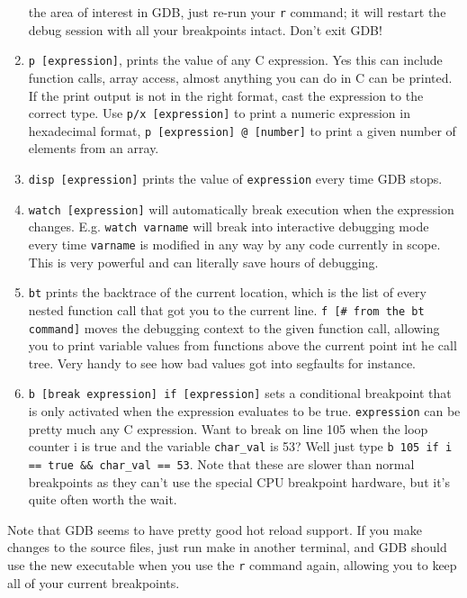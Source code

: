 \documentclass[11pt]{article}
\begin{document}
\begin{enumerate}
        the area of interest in GDB, just re-run your \texttt{r} command; it will restart
        the debug session with all your breakpoints intact. Don't exit GDB!
    \item \texttt{p [expression]}, prints the value of any C expression. Yes this can
        include function calls, array access, almost anything you can do in C can be
        printed. If the print output is not in the right format, cast the expression to
        the correct type. Use \texttt{p/x [expression]} to print a numeric expression in
        hexadecimal format, \texttt{p [expression] @ [number]} to print a given number of
        elements from an array.
    \item \texttt{disp [expression]} prints the value of \texttt{expression} every time
        GDB stops.
    \item \texttt{watch [expression]} will automatically break execution when the
        expression changes. E.g. \texttt{watch varname} will break into interactive
        debugging mode every time \texttt{varname} is modified in any way by any code
        currently in scope. This is very powerful and can literally save hours of
        debugging.
    \item \texttt{bt} prints the backtrace of the current location, which is the list of
        every nested function call that got you to the current line. \texttt{f [\# from the
        bt command]} moves the debugging context to the given function call, allowing you
        to print variable values from functions above the current point int he call tree.
        Very handy to see how bad values got into segfaults for instance.
    \item \texttt{b [break expression] if [expression]} sets a conditional breakpoint that
        is only activated when the expression evaluates to be true. \texttt{expression}
        can be pretty much any C expression. Want to break on line 105 when the loop
        counter i is true and the variable \texttt{char\_val} is 53? Well just type
        \texttt{b 105 if i == true \&\& char\_val == 53}. Note that these are slower than
        normal breakpoints as they can't use the special CPU breakpoint hardware, but it's
        quite often worth the wait.
\end{enumerate}

Note that GDB seems to have pretty good hot reload support. If you make changes to the
source files, just run make in another terminal, and GDB should use the new executable
when you use the \texttt{r} command again, allowing you to keep all of your current
breakpoints.
\end{document}
